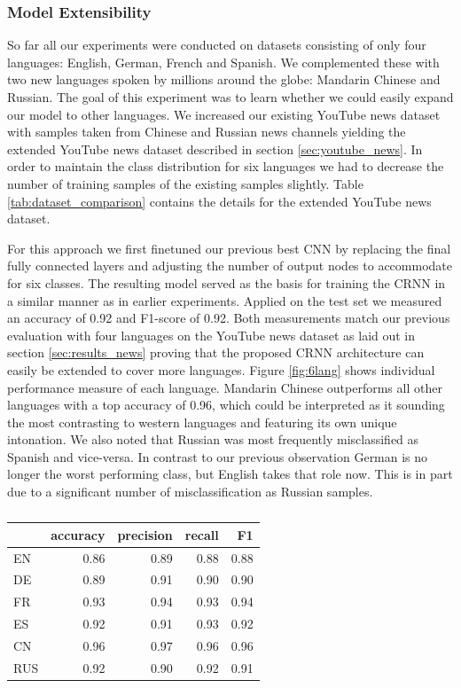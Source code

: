 \subsubsection{Model Extensibility} 
\label{sec:extensibility}
So far all our experiments were conducted on datasets consisting of only four languages: English, German, French and Spanish. We complemented these with two new languages spoken by millions around the globe: Mandarin Chinese and Russian. The goal of this experiment was to learn whether we could easily expand our model to other languages. 
We increased our existing YouTube news dataset with samples taken from Chinese and Russian news channels yielding the extended YouTube news dataset described in section \ref{sec:youtube_news}. In order to maintain the class distribution for six languages we had to decrease the number of training samples of the existing samples slightly. Table \ref{tab:dataset_comparison} contains the details for the extended YouTube news dataset.

For this approach we first finetuned our previous best CNN by replacing the final fully connected layers and adjusting the number of output nodes to accommodate for six classes. The resulting model served as the basis for training the CRNN in a similar manner as in earlier experiments. Applied on the test set we measured an accuracy of 0.92 and F1-score of 0.92. Both measurements match our previous evaluation with four languages on the YouTube news dataset as laid out in section \ref{sec:results_news} proving that the proposed CRNN architecture can easily be extended to cover more languages. Figure \ref{fig:6lang} shows individual performance measure of each language. Mandarin Chinese outperforms all other languages with a top accuracy of 0.96, which could be interpreted as it sounding the most contrasting to western languages and featuring its own unique intonation. We also noted that Russian was most frequently misclassified as Spanish and vice-versa. In contrast to our previous observation German is no longer the worst performing class, but English takes that role now. This is in part due to a significant number of misclassification as Russian samples.

	\begin{table}[]
	\centering
	\begin{tabularx}{\textwidth}{lrrrr}
	\toprule
     & accuracy & precision & recall  & F1 \\ \midrule
EN   & 0.86     & 0.89      & 0.88    & 0.88 \\
DE   & 0.89     & 0.91      & 0.90    & 0.90 \\
FR   & 0.93     & 0.94      & 0.93    & 0.94 \\
ES   & 0.92     & 0.91      & 0.93    & 0.92 \\
CN   & 0.96     & 0.97      & 0.96    & 0.96 \\
RUS  & 0.92     & 0.90      & 0.92    & 0.91 \\

 	\bottomrule
	\end{tabularx}
	\caption{}
	\label{tab:6lang}
	\end{table}

